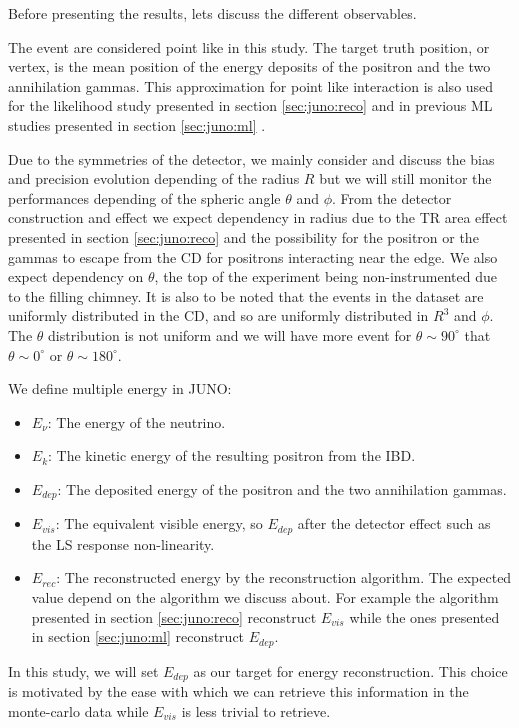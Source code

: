 \documentclass[../main.tex]{subfiles}
\begin{document}
Before presenting the results, lets discuss the different observables.

The event are considered point like in this study. The target truth position, or vertex, is the mean position of the energy deposits of the positron and the two annihilation gammas. This approximation for point like interaction is also used for the likelihood study presented in section \ref{sec:juno:reco} and in previous ML studies presented in section \ref{sec:juno:ml} \cite{qian_vertex_2021}.

Due to the symmetries of the detector, we mainly consider and discuss the bias and precision evolution depending of the radius $R$ but we will still monitor the performances depending of the spheric angle $\theta$ and $\phi$. From the detector construction and effect we expect dependency in radius due to the TR area effect presented in section \ref{sec:juno:reco} and the possibility for the positron or the gammas to escape from the CD for positrons interacting near the edge. We also expect dependency on $\theta$, the top of the experiment being non-instrumented due to the filling chimney. It is also to be noted that the events in the dataset are uniformly distributed in the CD, and so are uniformly distributed in $R^3$ and $\phi$. The $\theta$ distribution is not uniform and we will have more event for $\theta \sim 90^{\circ}$ that $\theta \sim 0^{\circ}$ or $\theta \sim 180^{\circ}$.

We define multiple energy in JUNO:
\begin{itemize}
  \item $E_\nu$: The energy of the neutrino.
  \item $E_k$: The kinetic energy of the resulting positron from the IBD.
  \item $E_{dep}$: The deposited energy of the positron and the two annihilation gammas.
  \item $E_{vis}$: The equivalent visible energy, so $E_{dep}$ after the detector effect such as the LS response non-linearity.
  \item $E_{rec}$: The reconstructed energy by the reconstruction algorithm. The expected value depend on the algorithm we discuss about. For example the algorithm presented in section \ref{sec:juno:reco} reconstruct $E_{vis}$ while the ones presented in section \ref{sec:juno:ml} reconstruct $E_{dep}$.
\end{itemize}

In this study, we will set $E_{dep}$ as our target for energy reconstruction. This choice is motivated by the ease with which we can retrieve this information in the monte-carlo data while $E_{vis}$ is less trivial to retrieve.
\end{document}
